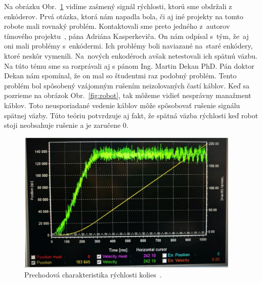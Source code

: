 Na obrázku Obr.~\ref{fig:prechChar} vidíme zašmený signál rýchlosti, ktorú sme obdržali z enkóderov. Prvá
otázka, ktorá nám napadla bola, či aj iné projekty na tomto robote mali rovnaký problém. Kontaktovali
sme preto jedného z~autorov tímového projektu~\cite{timovyProjekt}, pána Adriána Kasperkeviča. On nám odpísal s~tým,
že~aj oni mali problémy s~enkódermi. Ich problémy boli naviazané na~staré enkódery, ktoré neskôr
vymenili. Na~nových enkodéroch avšak netestovali ich spätnú väzbu. Na túto tému sme sa rozprávali
aj s pánom Ing. Martin Dekan PhD. Pán doktor Dekan nám spomínal, že on mal so študentmi raz podobný
problém. Tento problém bol spôsobený vzájomným rušením neizolovaných častí káblov. Keď sa pozrieme
na obrázok Obr.~\ref{fig:robot}, tak môžeme vidieť nesprávny manažment káblov. Toto neusporiadané vedenie káblov môže
spôsobovať rušenie signálu spätnej väzby. Túto teóriu potvrdzuje aj fakt, že spätná väzba rýchlosti
keď robot stoji neobsahuje rušenie a je zaručene 0.

\begin{figure}[!htbp]
	\begin{center}
		\includegraphics[width=0.95\textwidth]{img/robotSpeedChar.png}
	\end{center}
	\caption{Prechodová charakteristika rýchlosti kolies~\cite{timovyProjekt}. }
	\label{fig:prechChar}
\end{figure}

\clearpage
